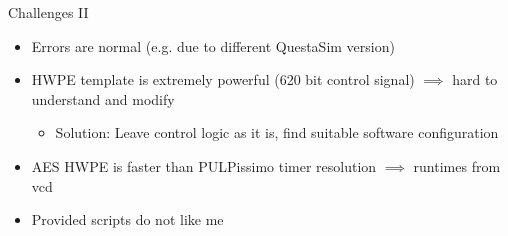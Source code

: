 \documentclass[aspectratio=169, nobackgroundmain]{beamer}
\begin{document}
\begin{frame}[fragile]{Challenges II}

  \begin{itemize}
      \item Errors are normal (e.g. due to different QuestaSim version)
      \item HWPE template is extremely powerful (620 bit control signal) $\implies$ hard to understand and modify \begin{itemize}
        \item Solution: Leave control logic as it is, find suitable software configuration
      \end{itemize}
      \item AES HWPE is faster than PULPissimo timer resolution $\implies$ runtimes from vcd
      \item Provided scripts do not like me
  \end{itemize}


\end{frame}
\end{document}

